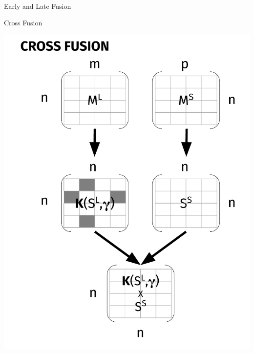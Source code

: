 \documentclass[10pt,=table]{beamer}
\begin{document}
\begin{frame}{Early and Late Fusion}
\end{frame}



\begin{frame}{Cross Fusion}
\begin{center}
\includegraphics[width=.55\linewidth]{image2/Chapitre3/xf_diag.pdf}
\end{center}
\end{frame}
\end{document}
